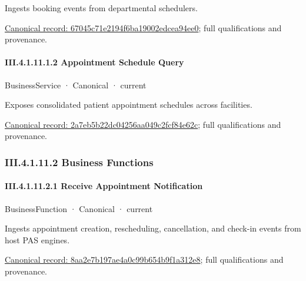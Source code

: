 Ingests booking events from departmental schedulers.


{\footnotesize \href{../../../../continuum/business/business-service/67045c71e2194f6ba19002edcea94ee0.md}{Canonical record: 67045c71e2194f6ba19002edcea94ee0}; full qualifications and provenance.}\par
\paragraph*{III.4.1.11.1.2 Appointment Schedule Query}
\label{navigation:III.4.1.11.1.2}

\label{element:2a7eb5b22dc04256aa049c2fcf84e62c}
{\small BusinessService · Canonical · current}\par

Exposes consolidated patient appointment schedules across facilities.


{\footnotesize \href{../../../../continuum/business/business-service/2a7eb5b22dc04256aa049c2fcf84e62c.md}{Canonical record: 2a7eb5b22dc04256aa049c2fcf84e62c}; full qualifications and provenance.}\par
\subsubsection*{III.4.1.11.2 Business Functions}
\label{navigation:III.4.1.11.2}

\paragraph*{III.4.1.11.2.1 Receive Appointment Notification}
\label{navigation:III.4.1.11.2.1}

\label{element:8aa2e7b197ae4a0c99b654b9f1a312e8}
{\small BusinessFunction · Canonical · current}\par

Ingests appointment creation, rescheduling, cancellation, and check-in events from host PAS engines.


{\footnotesize \href{../../../../continuum/business/business-function/8aa2e7b197ae4a0c99b654b9f1a312e8.md}{Canonical record: 8aa2e7b197ae4a0c99b654b9f1a312e8}; full qualifications and provenance.}\par
